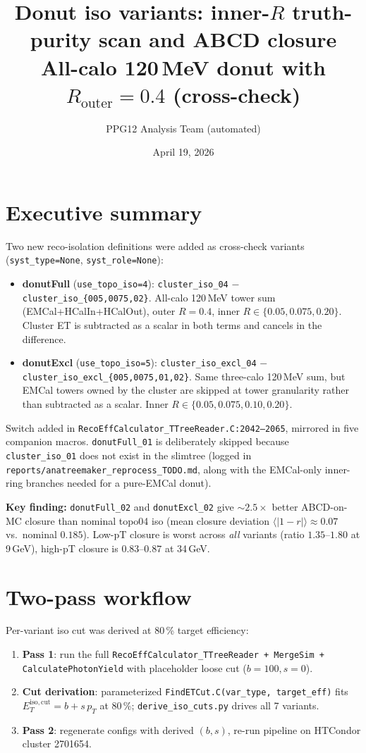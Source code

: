 \documentclass[11pt,a4paper]{article}
\title{Donut iso variants: inner-$R$ truth-purity scan and ABCD closure\\
\large All-calo 120\,MeV donut with $R_\mathrm{outer}=0.4$ (cross-check)}
\author{PPG12 Analysis Team (automated)}
\date{April 19, 2026}
\begin{document}
\maketitle

\section*{Executive summary}

Two new reco-isolation definitions were added as cross-check variants
(\texttt{syst\_type=None}, \texttt{syst\_role=None}):
\begin{itemize}
  \item \textbf{donutFull} (\texttt{use\_topo\_iso=4}):
    \texttt{cluster\_iso\_04} $-$ \texttt{cluster\_iso\_\{005,0075,02\}}.
    All-calo 120\,MeV tower sum (EMCal+HCalIn+HCalOut),
    outer $R=0.4$, inner $R \in \{0.05, 0.075, 0.20\}$.
    Cluster ET is subtracted as a scalar in both terms and cancels in the difference.
  \item \textbf{donutExcl} (\texttt{use\_topo\_iso=5}):
    \texttt{cluster\_iso\_excl\_04} $-$ \texttt{cluster\_iso\_excl\_\{005,0075,01,02\}}.
    Same three-calo 120\,MeV sum, but EMCal towers owned by the cluster are skipped at tower granularity
    rather than subtracted as a scalar. Inner $R \in \{0.05, 0.075, 0.10, 0.20\}$.
\end{itemize}

Switch added in \texttt{RecoEffCalculator\_TTreeReader.C:2042--2065}, mirrored in five companion macros.
\texttt{donutFull\_01} is deliberately skipped because \texttt{cluster\_iso\_01} does not exist in the slimtree
(logged in \texttt{reports/anatreemaker\_reprocess\_TODO.md}, along with the EMCal-only inner-ring branches
needed for a pure-EMCal donut).

\textbf{Key finding:} \texttt{donutFull\_02} and \texttt{donutExcl\_02} give
$\sim 2.5\times$ better ABCD-on-MC closure than nominal topo04 iso
(mean closure deviation $\langle|1-r|\rangle \approx 0.07$ vs.\ nominal $0.185$).
Low-pT closure is worst across \emph{all} variants (ratio $1.35$--$1.80$ at 9\,GeV),
high-pT closure is $0.83$--$0.87$ at 34\,GeV.

\section*{Two-pass workflow}

Per-variant iso cut was derived at 80\,\% target efficiency:
\begin{enumerate}
  \item \textbf{Pass 1}: run the full
    \texttt{RecoEffCalculator\_TTreeReader + MergeSim + CalculatePhotonYield}
    with placeholder loose cut ($b=100, s=0$).
  \item \textbf{Cut derivation}: parameterized
    \texttt{FindETCut.C(var\_type, target\_eff)} fits
    $E_T^\mathrm{iso,cut} = b + s\, p_T$ at 80\,\%;
    \texttt{derive\_iso\_cuts.py} drives all 7 variants.
  \item \textbf{Pass 2}: regenerate configs with derived $(b, s)$, re-run pipeline on HTCondor cluster 2701654.
\end{enumerate}
\end{document}
